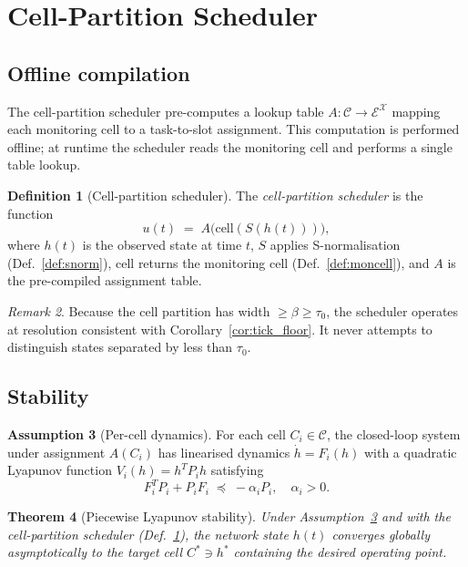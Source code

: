 \documentclass[11pt,twocolumn,a4paper]{article}
\theoremstyle{plain}
\newtheorem{theorem}{Theorem}[section]
\theoremstyle{definition}
\newtheorem{definition}[theorem]{Definition}
\newtheorem{assumption}[theorem]{Assumption}
\theoremstyle{remark}
\newtheorem{remark}[theorem]{Remark}
\newcommand{\E}{\mathcal{E}}
\newcommand{\X}{\mathcal{X}}
\newcommand{\C}{\mathcal{C}}
\newcommand{\tick}{\tau_0}
\newcommand{\floor}{\beta}
\newcommand{\cell}{\mathrm{cell}}
\newcommand{\Scal}{S}
\newcommand{\Lyap}{V}
\begin{document}
\section{Cell-Partition Scheduler}
\label{sec:scheduler}

\subsection{Offline compilation}

The cell-partition scheduler pre-computes a lookup table $A : \C \to \E^{\X}$ mapping each monitoring cell to a task-to-slot assignment. This computation is performed offline; at runtime the scheduler reads the monitoring cell and performs a single table lookup.

\begin{definition}[Cell-partition scheduler]
\label{def:scheduler}
The \emph{cell-partition scheduler} is the function
\[
  u(t) \;=\; A\bigl(\cell(\Scal(h(t)))\bigr),
\]
where $h(t)$ is the observed state at time $t$, $\Scal$ applies S-normalisation (Def.~\ref{def:snorm}), $\cell$ returns the monitoring cell (Def.~\ref{def:moncell}), and $A$ is the pre-compiled assignment table.
\end{definition}

\begin{remark}
Because the cell partition has width $\geq \floor \geq \tick$, the scheduler operates at resolution consistent with Corollary~\ref{cor:tick_floor}. It never attempts to distinguish states separated by less than $\tick$.
\end{remark}

\subsection{Stability}

\begin{assumption}[Per-cell dynamics]
\label{ass:dynamics}
For each cell $C_i \in \C$, the closed-loop system under assignment $A(C_i)$ has linearised dynamics $\dot{h} = F_i(h)$ with a quadratic Lyapunov function $\Lyap_i(h) = h^T P_i h$ satisfying
\[
  F_i^T P_i + P_i F_i \;\preceq\; -\alpha_i P_i, \quad \alpha_i > 0.
\]
\end{assumption}

\begin{theorem}[Piecewise Lyapunov stability]
\label{thm:lyapunov}
Under Assumption~\ref{ass:dynamics} and with the cell-partition scheduler (Def.~\ref{def:scheduler}), the network state $h(t)$ converges globally asymptotically to the target cell $C^* \ni h^*$ containing the desired operating point.
\end{theorem}
\end{document}
